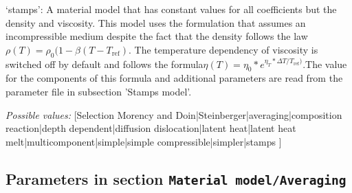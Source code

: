 \begin{itemize}
`stamps': A material model that has constant values for all coefficients but the density and viscosity. This model uses the formulation that assumes an incompressible medium despite the fact that the density follows the law $\rho(T)=\rho_0(1-\beta(T-T_{\text{ref}})$. The temperature dependency of viscosity is  switched off by default and follows the formula$\eta(T)=\eta_0*e^{\eta_T*\Delta T / T_{\text{ref}})}$.The value for the components of this formula and additional parameters are read from the parameter file in subsection 'Stamps model'.


{\it Possible values:} [Selection Morency and Doin|Steinberger|averaging|composition reaction|depth dependent|diffusion dislocation|latent heat|latent heat melt|multicomponent|simple|simple compressible|simpler|stamps ]
\end{itemize}



\subsection{Parameters in section \tt Material model/Averaging}
\label{parameters:Material_20model/Averaging}

